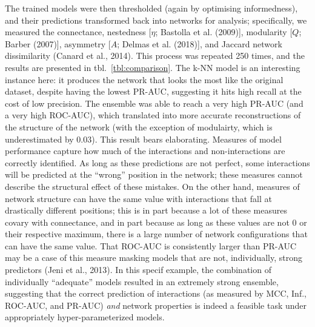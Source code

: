 \documentclass[11pt]{article}
\begin{document}
The trained models were then thresholded (again by optimising
informedness), and their predictions transformed back into networks for
analysis; specifically, we measured the connectance, nestedness
{[}\(\eta\); Bastolla et al. (2009){]}, modularity {[}\(Q\); Barber
(2007){]}, asymmetry {[}\(A\); Delmas et al. (2018){]}, and Jaccard
network dissimilarity (Canard et al., 2014). This process was repeated
250 times, and the results are presented in tbl.~\ref{tbl:comparison}.
The k-NN model is an interesting instance here: it produces the network
that looks the most like the original dataset, despite having the lowest
PR-AUC, suggesting it hits high recall at the cost of low precision. The
ensemble was able to reach a very high PR-AUC (and a very high ROC-AUC),
which translated into more accurate reconstructions of the structure of
the network (with the exception of modulairty, which is underestimated
by \(0.03\)). This result bears elaborating. Measures of model
performance capture how much of the interactions and non-interactions
are correctly identified. As long as these predictions are not perfect,
some interactions will be predicted at the ``wrong'' position in the
network; these measures cannot describe the structural effect of these
mistakes. On the other hand, measures of network structure can have the
same value with interactions that fall at drastically different
positions; this is in part because a lot of these measures covary with
connectance, and in part because as long as these values are not 0 or
their respective maximum, there is a large number of network
configurations that can have the same value. That ROC-AUC is
consistently larger than PR-AUC may be a case of this measure masking
models that are not, individually, strong predictors (Jeni et al.,
2013). In this specif example, the combination of individually
``adequate'' models resulted in an extremely strong ensemble, suggesting
that the correct prediction of interactions (as measured by MCC, Inf.,
ROC-AUC, and PR-AUC) \emph{and} network properties is indeed a feasible
task under appropriately hyper-parameterized models.
\end{document}
